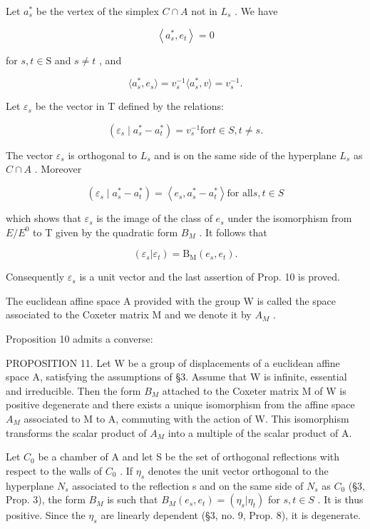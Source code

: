 Let \(a_{s}^{*}\) be the vertex of the simplex \(C \cap A\) not in \(L_{s}\) . We have

\[
\left\langle a _ {s} ^ {*}, e _ {t} \right\rangle = 0
\]

for \(s,t\in \mathrm{S}\) and \(s\neq t\) , and

\[
\langle a _ {s} ^ {*}, e _ {s} \rangle = v _ {s} ^ {- 1} \langle a _ {s} ^ {*}, v \rangle = v _ {s} ^ {- 1}.
\]

Let \(\varepsilon_{s}\) be the vector in T defined by the relations:

\[
\left(\varepsilon_ {s} \mid a _ {s} ^ {*} - a _ {t} ^ {*}\right) = v _ {s} ^ {- 1} \text {for} t \in S, t \neq s.
\]

The vector \(\varepsilon_{s}\) is orthogonal to \(L_{s}\) and is on the same side of the hyperplane \(L_{s}\) as \(C \cap A\) . Moreover

\[
\left(\varepsilon_ {s} \mid a _ {s} ^ {*} - a _ {t} ^ {*}\right) = \left\langle e _ {s}, a _ {s} ^ {*} - a _ {t} ^ {*} \right\rangle \text {for all} s, t \in S
\]

which shows that \(\varepsilon_{s}\) is the image of the class of \(e_{s}\) under the isomorphism from \(E/E^{0}\) to T given by the quadratic form \(B_{M}\) . It follows that

\[
(\varepsilon_ {s} | \varepsilon_ {t}) = \mathrm{B} _ {\mathrm{M}} (e _ {s}, e _ {t}).
\]

Consequently \(\varepsilon_{s}\) is a unit vector and the last assertion of Prop. 10 is proved.

The euclidean affine space A provided with the group W is called the space associated to the Coxeter matrix M and we denote it by \(A_{M}\) .

Proposition 10 admits a converse:

PROPOSITION 11. Let W be a group of displacements of a euclidean affine space A, satisfying the assumptions of §3. Assume that W is infinite, essential and irreducible. Then the form \(B_{M}\) attached to the Coxeter matrix M of W is positive degenerate and there exists a unique isomorphism from the affine space \(A_{M}\) associated to M to A, commuting with the action of W. This isomorphism transforms the scalar product of \(A_{M}\) into a multiple of the scalar product of A.

Let \(C_0\) be a chamber of A and let S be the set of orthogonal reflections with respect to the walls of \(C_0\) . If \(\eta_s\) denotes the unit vector orthogonal to the hyperplane \(N_s\) associated to the reflection s and on the same side of \(N_s\) as \(C_0\) (§3, Prop. 3), the form \(B_M\) is such that \(B_M(e_s, e_t) = (\eta_s | \eta_t)\) for \(s, t \in S\) . It is thus positive. Since the \(\eta_s\) are linearly dependent (§3, no. 9, Prop. 8), it is degenerate.

